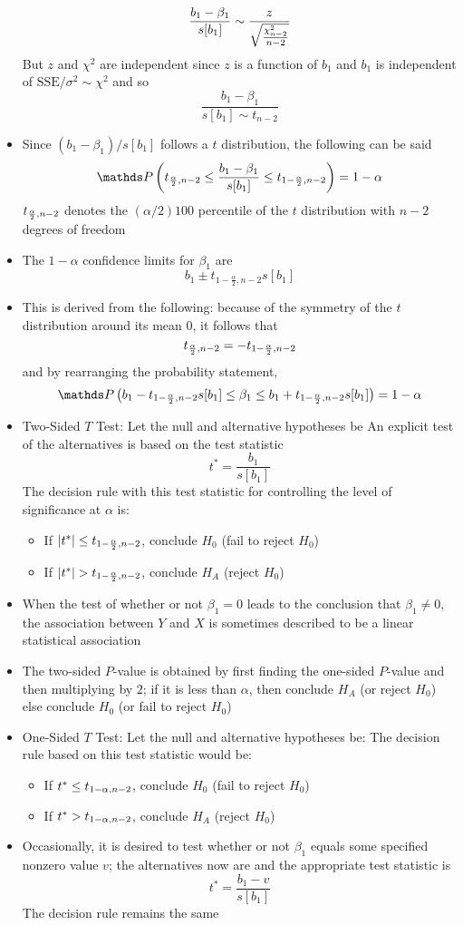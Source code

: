 \begin{itemize}
$$ \frac{b_1 - \beta_1}{s[b_1]} \sim \frac{z}{\sqrt{ \frac{\chi^2_{n-2}}{n-2}}} $$ But $z$ and $\chi^2$ are independent since $z$ is a function of $b_1$ and $b_1$ is independent of $\text{SSE}/\sigma^2 \sim \chi^2$ and so $$ \frac{b_1 - \beta_1}{s[b_1] \sim t_{n-2}} $$ 
\item  Since $(b_1 - \beta_1)/s[b_1]$ follows a $t$ distribution, the following can be said $$ \prob{\tdist{\frac{\alpha}{2}}{n-2} \leq \frac{b_1 - \beta_1}{s[b_1]} \leq \tdist{1 - \frac{\alpha}{2}}{n-2}} = 1 - \alpha $$ 
$t_{\frac{\alpha}{2}, n-2}$ denotes the $(\alpha/2)100$ percentile of the $t$ distribution with $n-2$ degrees of freedom
\item The $1-\alpha$ confidence limits for $\beta_1$ are $$ b_1 \pm t_{1 - \frac{\alpha}{2}, n-2} s[b_1] $$ 
\item This is derived from the following: because of the symmetry of the $t$ distribution around its mean $0$, it follows that $$ t_{\frac{\alpha}{2}, n-2} = -t_{1 - \frac{\alpha}{2}, n-2} $$ and by rearranging the probability statement,
$$ \prob{b_1 - \tdist{1 - \frac{\alpha}{2}}{n-2}s[b_1] \leq \beta_1 \leq b_1 + \tdist{1 - \frac{\alpha}{2}}{n-2} s[b_1]} = 1 - \alpha $$ 
\item Two-Sided $T$ Test: Let the null and alternative hypotheses be  An explicit test of the alternatives is based on the test statistic $$ t^* = \frac{b_1}{s[b_1]} $$ The decision rule with this test statistic for controlling the level of significance at $\alpha$ is: \begin{itemize} 
\item If $\abs{t^*} \leq t_{1 - \frac{\alpha}{2}, n-2}$, conclude $H_0$ (fail to reject $H_0$)
\item If $\abs{t^*} > t_{1 - \frac{\alpha}{2}, n-2}$, conclude $H_A$ (reject $H_0$) \end{itemize} 
\item When the test of whether or not $\beta_1 = 0$ leads to the conclusion that $\beta_1 \neq 0$, the association between $Y$ and $X$ is sometimes described to be a linear statistical association 
\item The two-sided $P$-value is obtained by first finding the one-sided $P$-value and then multiplying by $2$; if it is less than $\alpha$, then conclude $H_A$ (or reject $H_0$) else conclude $H_0$ (or fail to reject $H_0$)
\item One-Sided $T$ Test: Let the null and alternative hypotheses be:  The decision rule based on this test statistic would be: \begin{itemize} 
\item If $t^* \leq t_{1 - \alpha, n-2}$, conclude $H_0$ (fail to reject $H_0$)
\item If $t^* > t_{1-\alpha, n-2}$, conclude $H_A$ (reject $H_0$) \end{itemize}
\item Occasionally, it is desired to test whether or not $\beta_1$ equals some specified nonzero value $v$; the alternatives now are  and the appropriate test statistic is $$ t^* = \frac{b_1 - v}{s[b_1]} $$ The decision rule remains the same
\end{itemize} 
